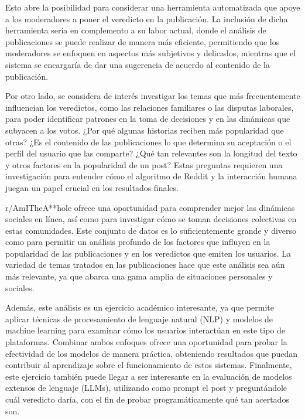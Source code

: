 Esto abre la posibilidad para considerar una herramienta automatizada que apoye a los moderadores a poner el veredicto en la publicación. La inclusión de dicha herramienta sería en complemento a su labor actual, donde el análisis de publicaciones se puede realizar de manera más eficiente, permitiendo que los moderadores se enfoquen en aspectos más subjetivos y delicados, mientras que el sistema se encargaría de dar una sugerencia de acuerdo al contenido de la publicación.

Por otro lado, se considera de interés investigar los temas que más frecuentemente influencian los veredictos, como las relaciones familiares o las disputas laborales, para poder identificar patrones en la toma de decisiones y en las dinámicas que subyacen a los votos. ¿Por qué algunas historias reciben más popularidad que otras? ¿Es el contenido de las publicaciones lo que determina su aceptación o el perfil del usuario que las comparte? ¿Qué tan relevantes son la longitud del texto y otros factores en la popularidad de un post? Estas preguntas requieren una investigación para entender cómo el algoritmo de Reddit y la interacción humana juegan un papel crucial en los resultados finales.

r/AmITheA**hole ofrece una oportunidad para comprender mejor las dinámicas sociales en línea, así como para investigar cómo se toman decisiones colectivas en estas comunidades. Este conjunto de datos es lo suficientemente grande y diverso como para permitir un análisis profundo de los factores que influyen en la popularidad de las publicaciones y en los veredictos que emiten los usuarios. La variedad de temas tratados en las publicaciones hace que este análisis sea aún más relevante, ya que abarca una gama amplia de situaciones personales y sociales.

Además, este análisis es un ejercicio académico interesante, ya que permite aplicar técnicas de procesamiento de lenguaje natural (NLP) y modelos de machine learning para examinar cómo los usuarios interactúan en este tipo de plataformas. Combinar ambos enfoques ofrece una oportunidad para probar la efectividad de los modelos de manera práctica, obteniendo resultados que puedan contribuir al aprendizaje sobre el funcionamiento de estos sistemas. Finalmente, este ejercicio también puede llegar a ser interesante en la evaluación de modelos extensos de lenguaje (LLMs), utilizando como prompt el post y preguntándole cuál veredicto daría, con el fin de probar programáticamente qué tan acertados son.


